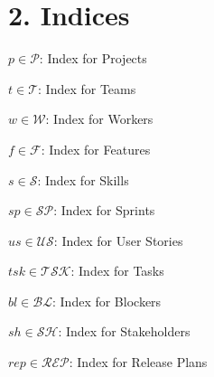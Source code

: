 \documentclass[12pt]{article}
\begin{document}
\section{2. Indices}
\item $ p \in \mathcal{P} $: Index for Projects
    \item $ t \in \mathcal{T} $: Index for Teams
    \item $ w \in \mathcal{W} $: Index for Workers
    \item $ f \in \mathcal{F} $: Index for Features
    \item $ s \in \mathcal{S} $: Index for Skills
    \item $ sp \in \mathcal{SP} $: Index for Sprints
    \item $ us \in \mathcal{US} $: Index for User Stories
    \item $ tsk \in \mathcal{TSK} $: Index for Tasks
    \item $ bl \in \mathcal{BL} $: Index for Blockers
    \item $ sh \in \mathcal{SH} $: Index for Stakeholders
    \item $ rep \in \mathcal{REP} $: Index for Release Plans
\end{document}
